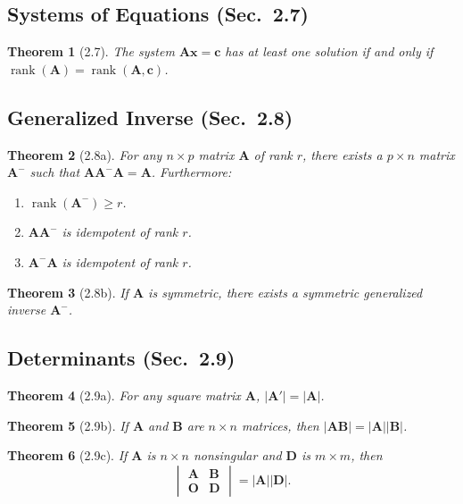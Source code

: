 \documentclass{article}
\newtheorem{theorem}{Theorem}[section]
\begin{document}
\subsection{Systems of Equations (Sec.\ 2.7)}

\begin{theorem}[2.7]
The system $\mathbf{A}\mathbf{x} = \mathbf{c}$ has at least one solution if and only if $\operatorname{rank}(\mathbf{A}) = \operatorname{rank}(\mathbf{A}, \mathbf{c})$.
\end{theorem}

\subsection{Generalized Inverse (Sec.\ 2.8)}

\begin{theorem}[2.8a]
For any $n \times p$ matrix $\mathbf{A}$ of rank $r$, there exists a $p \times n$ matrix $\mathbf{A}^{-}$ such that $\mathbf{A}\mathbf{A}^{-}\mathbf{A} = \mathbf{A}$. Furthermore:
\begin{enumerate}[label=(\roman*)]
\item $\operatorname{rank}(\mathbf{A}^{-}) \geq r$.
\item $\mathbf{A}\mathbf{A}^{-}$ is idempotent of rank $r$.
\item $\mathbf{A}^{-}\mathbf{A}$ is idempotent of rank $r$.
\end{enumerate}
\end{theorem}

\begin{theorem}[2.8b]
If $\mathbf{A}$ is symmetric, there exists a symmetric generalized inverse $\mathbf{A}^{-}$.
\end{theorem}

\subsection{Determinants (Sec.\ 2.9)}

\begin{theorem}[2.9a]
For any square matrix $\mathbf{A}$, $|\mathbf{A}'| = |\mathbf{A}|$.
\end{theorem}

\begin{theorem}[2.9b]
If $\mathbf{A}$ and $\mathbf{B}$ are $n \times n$ matrices, then $|\mathbf{A}\mathbf{B}| = |\mathbf{A}||\mathbf{B}|$.
\end{theorem}

\begin{theorem}[2.9c]
If $\mathbf{A}$ is $n \times n$ nonsingular and $\mathbf{D}$ is $m \times m$, then
\[
\begin{vmatrix} \mathbf{A} & \mathbf{B} \\ \mathbf{O} & \mathbf{D} \end{vmatrix} = |\mathbf{A}||\mathbf{D}|.
\]
\end{theorem}
\end{document}
